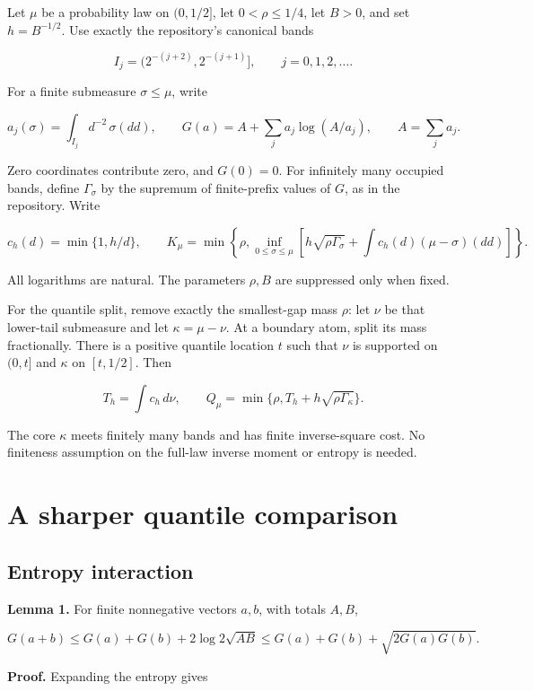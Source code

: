 \documentclass[
  11pt,
  a4paper,
]{article}
\begin{document}
Let \(\mu\) be a probability law on \((0,1/2]\), let \(0<\rho\le1/4\),
let \(B>0\), and set \(h=B^{-1/2}\). Use exactly the repository's
canonical bands

\[
I_j=(2^{-(j+2)},2^{-(j+1)}],\qquad j=0,1,2,\ldots.
\]

For a finite submeasure \(\sigma\le\mu\), write

\[
a_j(\sigma)=\int_{I_j}d^{-2}\,\sigma(dd),\qquad
G(a)=A+\sum_j a_j\log(A/a_j),\qquad A=\sum_j a_j.
\]

Zero coordinates contribute zero, and \(G(0)=0\). For infinitely many
occupied bands, define \(\Gamma_\sigma\) by the supremum of
finite-prefix values of \(G\), as in the repository. Write

\[
c_h(d)=\min\{1,h/d\},\qquad
K_\mu=\min\left\{\rho,\inf_{0\le\sigma\le\mu}
  \left[h\sqrt{\rho\Gamma_\sigma}+\int c_h(d)(\mu-\sigma)(dd)\right]\right\}.
\]

All logarithms are natural. The parameters \(\rho,B\) are suppressed
only when fixed.

For the quantile split, remove exactly the smallest-gap mass \(\rho\):
let \(\nu\) be that lower-tail submeasure and let \(\kappa=\mu-\nu\). At
a boundary atom, split its mass fractionally. There is a positive
quantile location \(t\) such that \(\nu\) is supported on \((0,t]\) and
\(\kappa\) on \([t,1/2]\). Then

\[
T_h=\int c_h\,d\nu,\qquad
Q_\mu=\min\{\rho,T_h+h\sqrt{\rho\Gamma_\kappa}\}.
\]

The core \(\kappa\) meets finitely many bands and has finite
inverse-square cost. No finiteness assumption on the full-law inverse
moment or entropy is needed.

\section{A sharper quantile
comparison}\label{a-sharper-quantile-comparison}

\subsection{Entropy interaction}\label{entropy-interaction}

\textbf{Lemma 1.} For finite nonnegative vectors \(a,b\), with totals
\(A,B\),

\[
G(a+b)\le G(a)+G(b)+2\log 2\sqrt{AB}
          \le G(a)+G(b)+\sqrt{2G(a)G(b)}.
\]

\textbf{Proof.} Expanding the entropy gives
\end{document}
